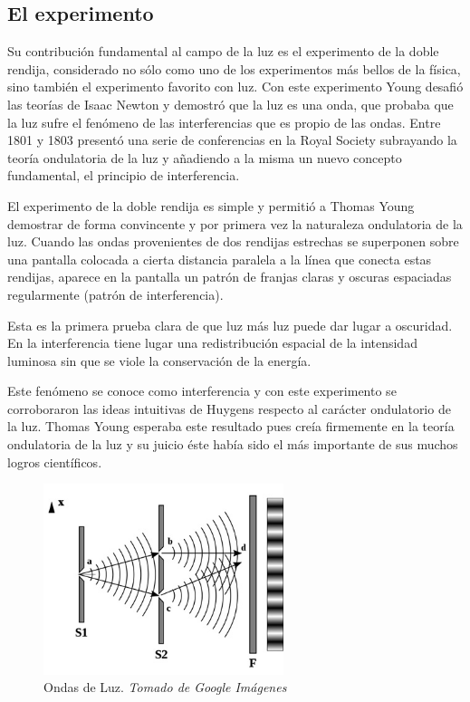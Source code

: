 \documentclass[journal]{IEEEtran}
\begin{document}
\subsection{El experimento}

Su contribución fundamental al campo de la luz es el experimento de la doble rendija, considerado no sólo como uno de los experimentos más bellos de la física, sino también el experimento favorito con luz. Con este experimento Young desafió las teorías de Isaac Newton y demostró que la luz es una onda, que probaba que la luz sufre el fenómeno de las interferencias que es propio de las ondas. Entre 1801 y 1803 presentó una serie de conferencias en la Royal Society subrayando la teoría ondulatoria de la luz y añadiendo a la misma un nuevo concepto fundamental, el principio de interferencia. 

El experimento de la doble rendija es simple y permitió a Thomas Young demostrar de forma convincente y por primera vez la naturaleza ondulatoria de la luz. Cuando las ondas provenientes de dos rendijas estrechas se superponen sobre una pantalla colocada a cierta distancia paralela a la línea que conecta estas rendijas, aparece en la pantalla un patrón de franjas claras y oscuras espaciadas regularmente (patrón de interferencia).

Esta es la primera prueba clara de que luz más luz puede dar lugar a oscuridad. En la interferencia tiene lugar una redistribución espacial de la intensidad luminosa sin que se viole la conservación de la energía. 

Este fenómeno se conoce como interferencia y con este experimento se corroboraron las ideas intuitivas de Huygens respecto al carácter ondulatorio de la luz. Thomas Young esperaba este resultado pues creía firmemente en la teoría ondulatoria de la luz y su juicio éste había sido el más importante de sus muchos logros científicos.

\begin{center}
  \begin{figure}[h!]
  \includegraphics[width=70mm]{ondas_luz.jpg}
  \caption{Ondas de Luz. \emph{Tomado de Google Imágenes}}
  \end{figure}
\end{center}
\end{document}
